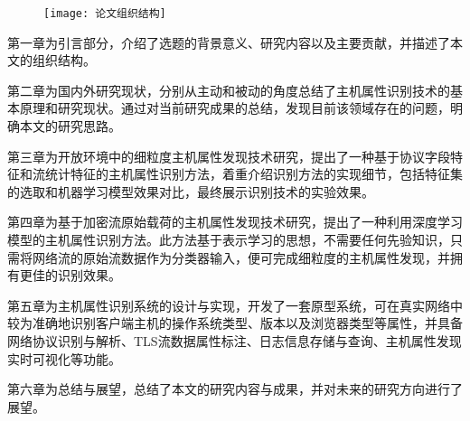 \begin{figure}[!htbp]
    \centering
    \texttt{[image: 论文组织结构]}
\end{figure}

第一章为引言部分，介绍了选题的背景意义、研究内容以及主要贡献，并描述了本文的组织结构。

第二章为国内外研究现状，分别从主动和被动的角度总结了主机属性识别技术的基本原理和研究现状。通过对当前研究成果的总结，发现目前该领域存在的问题，明确本文的研究思路。

第三章为开放环境中的细粒度主机属性发现技术研究，提出了一种基于协议字段特征和流统计特征的主机属性识别方法，着重介绍识别方法的实现细节，包括特征集的选取和机器学习模型效果对比，最终展示识别技术的实验效果。

第四章为基于加密流原始载荷的主机属性发现技术研究，提出了一种利用深度学习模型的主机属性识别方法。此方法基于表示学习的思想，不需要任何先验知识，只需将网络流的原始流数据作为分类器输入，便可完成细粒度的主机属性发现，并拥有更佳的识别效果。

第五章为主机属性识别系统的设计与实现，开发了一套原型系统，可在真实网络中较为准确地识别客户端主机的操作系统类型、版本以及浏览器类型等属性，并具备网络协议识别与解析、TLS流数据属性标注、日志信息存储与查询、主机属性发现实时可视化等功能。

第六章为总结与展望，总结了本文的研究内容与成果，并对未来的研究方向进行了展望。